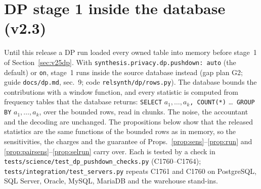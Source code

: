 \section{DP stage 1 inside the database (v2.3)}\label{sec:g2push}
\setcounter{savedproppush}{\value{proposition}}
Until this release a DP run loaded every owned table into memory before stage~1 of Section~\ref{sec:v25dp}. With \texttt{synthesis.privacy.dp.pushdown: auto} (the default) or \texttt{on}, stage~1 runs inside the source database instead (gap plan G2; guide \texttt{docs/dp.md}, sec.~9; code \texttt{relsynth/dp/rows.py}). The database bounds the contributions with a window function, and every statistic is computed from frequency tables that the database returns: \texttt{SELECT} $a_1,\dots,a_k$\texttt{, COUNT(*)} \ldots\ \texttt{GROUP BY} $a_1,\dots,a_k$, over the bounded rows, read in chunks. The noise, the accountant and the decoding are unchanged. The propositions below show that the released statistics are the same functions of the bounded rows as in memory, so the sensitivities, the charges and the guarantee of Props.~\ref{prop:sens}--\ref{prop:run} and \ref{prop:pairsens}--\ref{prop:selrun} carry over. Each is tested by a check in \texttt{tests/science/test\_dp\_pushdown\_checks.py} (C1760--C1764); \texttt{tests/integration/test\_servers.py} repeats C1761 and C1760 on PostgreSQL, SQL Server, Oracle, MySQL, MariaDB and the warehouse stand-ins.

